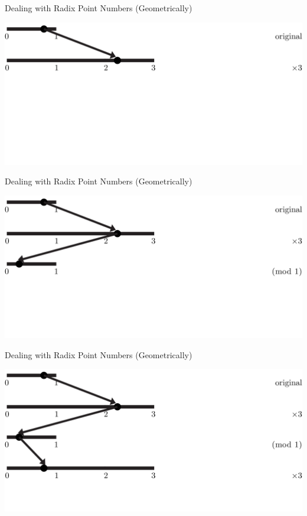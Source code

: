 \documentclass{beamer}
\begin{document}
        \begin{frame}{Dealing with Radix Point Numbers (Geometrically)}
          \begin{example}
            \includegraphics[width=\textwidth,height=0.75\textheight]{images/Ternary/2}
          \end{example}
        \end{frame}

        \begin{frame}{Dealing with Radix Point Numbers (Geometrically)}
          \begin{example}
            \includegraphics[width=\textwidth,height=0.75\textheight]{images/Ternary/3}
          \end{example}
        \end{frame}

        \begin{frame}{Dealing with Radix Point Numbers (Geometrically)}
          \begin{example}
            \includegraphics[width=\textwidth,height=0.75\textheight]{images/Ternary/4}
          \end{example}
        \end{frame}
\end{document}
